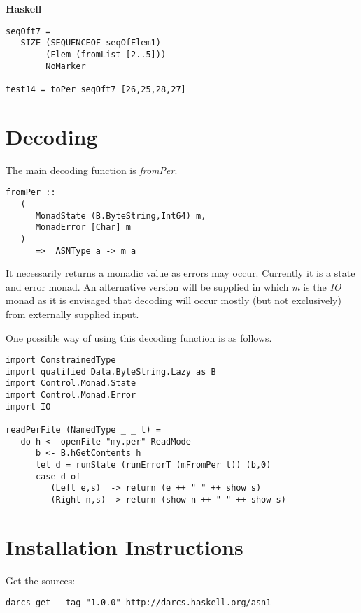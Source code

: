 \documentclass{article}
\begin{document}
{\bf Haskell}

\begin{lstlisting}[frame=single]
seqOft7 = 
   SIZE (SEQUENCEOF seqOfElem1) 
        (Elem (fromList [2..5])) 
        NoMarker

test14 = toPer seqOft7 [26,25,28,27]
\end{lstlisting}

\section{Decoding}

The main decoding function is {\em fromPer}.

\begin{lstlisting}[frame=single]
fromPer :: 
   (
      MonadState (B.ByteString,Int64) m, 
      MonadError [Char] m
   ) 
      =>  ASNType a -> m a
\end{lstlisting}

It necessarily returns a monadic value as errors may occur. Currently it is a state and error monad. 
An alternative version will be supplied
in which {\em m} is the {\em IO} monad as it is envisaged that decoding will occur mostly (but not exclusively)
from externally supplied input.

One possible way of using this decoding function is as follows.

\begin{lstlisting}[frame=single]
import ConstrainedType
import qualified Data.ByteString.Lazy as B
import Control.Monad.State
import Control.Monad.Error
import IO

readPerFile (NamedType _ _ t) =
   do h <- openFile "my.per" ReadMode
      b <- B.hGetContents h
      let d = runState (runErrorT (mFromPer t)) (b,0)
      case d of
         (Left e,s)  -> return (e ++ " " ++ show s)
         (Right n,s) -> return (show n ++ " " ++ show s)
\end{lstlisting}

\section{Installation Instructions}

Get the sources:

\lstset{language=shell,basicstyle=\ttfamily\small}
\begin{lstlisting}[frame=single]
darcs get --tag "1.0.0" http://darcs.haskell.org/asn1
\end{lstlisting}
\end{document}
